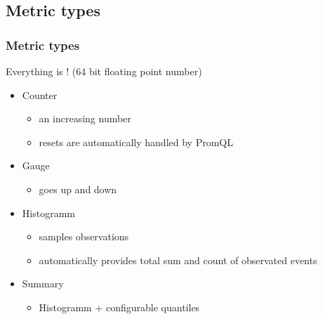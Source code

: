 \subsection{Metric types}
\begin{frame}
  \frametitle{Metric types}

  Everything is  ! {\small(64 bit floating point number)}
  
  \begin{itemize}
   \item Counter 
    \begin{itemize}
     \item an increasing number 
     \item resets are automatically handled by PromQL
    \end{itemize}

   \item Gauge
    \begin{itemize}
     \item goes up and down
    \end{itemize}

   \item Histogramm
    \begin{itemize}
     \item samples observations
     \item automatically provides total sum and count of observated events
    \end{itemize}

   \item Summary
    \begin{itemize}
     \item Histogramm + configurable quantiles
    \end{itemize}

  \end{itemize}
\end{frame}

